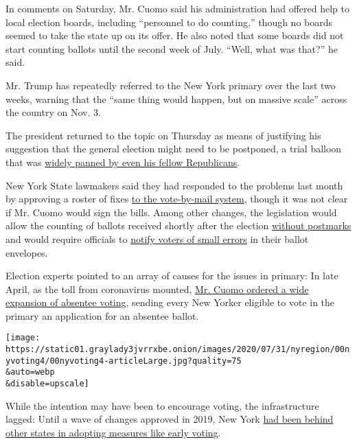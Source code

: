In comments on Saturday, Mr. Cuomo said his administration had offered
help to local election boards, including ``personnel to do counting,''
though no boards seemed to take the state up on its offer. He also noted
that some boards did not start counting ballots until the second week of
July. ``Well, what was that?'' he said.

Mr. Trump has repeatedly referred to the New York primary over the last
two weeks, warning that the ``same thing would happen, but on massive
scale'' across the country on Nov. 3.

The president returned to the topic on Thursday as means of justifying
his suggestion that the general election might need to be postponed, a
trial balloon that was
\href{https://www.nytimes3xbfgragh.onion/2020/07/31/us/politics/trump-tweet-democracy.html}{widely
panned by even his fellow Republicans}.

New York State lawmakers said they had responded to the problems last
month by approving a roster of fixes
\href{https://www.nysenate.gov/newsroom/press-releases/senate-majority-advances-automatic-voter-registration-system-strengthens}{to
the vote-by-mail system}, though it was not clear if Mr. Cuomo would
sign the bills. Among other changes, the legislation would allow the
counting of ballots received shortly after the election
\href{https://www.nysenate.gov/legislation/bills/2019/s8799/amendment/a}{without
postmarks} and would require officials to
\href{https://www.nysenate.gov/legislation/bills/2019/s8370/amendment/b}{notify
voters of small errors} in their ballot envelopes.

Election experts pointed to an array of causes for the issues in
primary: In late April, as the toll from coronavirus mounted,
\href{https://www.governor.ny.gov/news/amid-ongoing-covid-19-pandemic-governor-cuomo-issues-executive-order-make-sure-every-new-yorker}{Mr.
Cuomo ordered a wide expansion of absentee voting}, sending every New
Yorker eligible to vote in the primary an application for an absentee
ballot.

\texttt{[image: https://static01.graylady3jvrrxbe.onion/images/2020/07/31/nyregion/00nyvoting4/00nyvoting4-articleLarge.jpg?quality=75\\\&auto=webp\\\&disable=upscale]}

While the intention may have been to encourage voting, the
infrastructure lagged: Until a wave of changes approved in 2019, New
York
\href{https://www.nytimes3xbfgragh.onion/2019/01/10/nyregion/voting-reform-election-ny.html}{had
been behind other states in adopting measures like early voting}.

